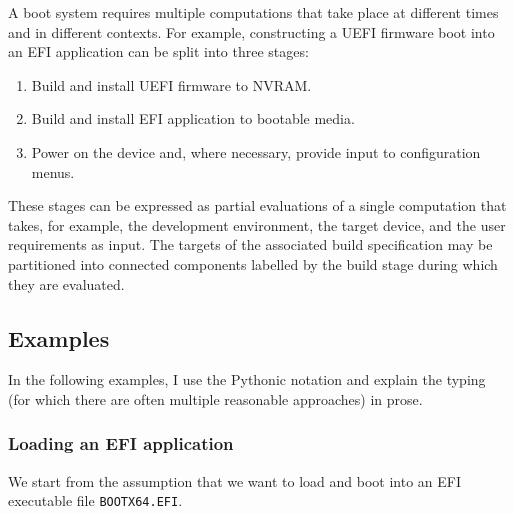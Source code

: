 A boot system requires multiple computations that take place at different times and in different contexts. 
%
For example, constructing a UEFI firmware boot into an EFI application can be split into three stages:
\begin{enumerate}
  \item Build and install UEFI firmware to NVRAM.
  \item Build and install EFI application to bootable media.
  \item Power on the device and, where necessary, provide input to configuration menus.
\end{enumerate}
These stages can be expressed as partial evaluations of a single computation that takes, for example, the development environment, the target device, and the user requirements as input.
%
The targets of the associated build specification may be partitioned into connected components labelled by the build stage during which they are evaluated.

\subsection{Examples}

In the following examples, I use the Pythonic notation and explain the typing (for which there are often multiple reasonable approaches) in prose.

\subsubsection{Loading an EFI application}

We start from the assumption that we want to load and boot into an EFI
executable file \texttt{BOOTX64.EFI}.

